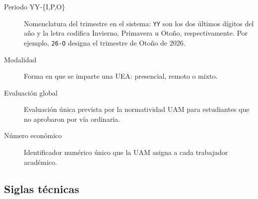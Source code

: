 \begin{description}
    \item[Periodo YY-\{I,P,O\}] Nomenclatura del trimestre en el sistema: \texttt{YY} son los dos últimos dígitos del año y la letra codifica Invierno, Primavera u Otoño, respectivamente. Por ejemplo, \texttt{26-O} designa el trimestre de Otoño de 2026.
    \item[Modalidad] Forma en que se imparte una UEA: presencial, remoto o mixto.
    \item[Evaluación global] Evaluación única prevista por la normatividad UAM para estudiantes que no aprobaron por vía ordinaria.
    \item[Número económico] Identificador numérico único que la UAM asigna a cada trabajador académico.
\end{description}

\subsection*{Siglas técnicas}

